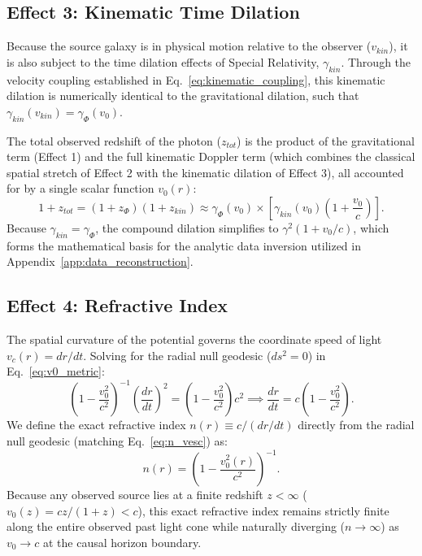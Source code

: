 \documentclass[11pt]{article}
\begin{document}
\subsection{Effect 3: Kinematic Time Dilation}
Because the source galaxy is in physical motion relative to the observer ($v_{kin}$), it is also subject to the time dilation effects of Special Relativity, $\gamma_{kin}$. Through the velocity coupling established in Eq.~\ref{eq:kinematic_coupling}, this kinematic dilation is numerically identical to the gravitational dilation, such that $\gamma_{kin}(v_{kin}) = \gamma_{\Phi}(v_0)$.

The total observed redshift of the photon ($z_{tot}$) is the product of the gravitational term (Effect 1) and the full kinematic Doppler term (which combines the classical spatial stretch of Effect 2 with the kinematic dilation of Effect 3), all accounted for by a single scalar function $v_0(r)$:
\begin{equation}
1 + z_{tot} = (1 + z_{\Phi}) (1 + z_{kin}) \approx \gamma_{\Phi}(v_0) \times \left[ \gamma_{kin}(v_0) \left(1 + \frac{v_0}{c}\right) \right].
\end{equation}
Because $\gamma_{kin} = \gamma_{\Phi}$, the compound dilation simplifies to $\gamma^2(1+v_0/c)$, which forms the mathematical basis for the analytic data inversion utilized in Appendix~\ref{app:data_reconstruction}.

\subsection{Effect 4: Refractive Index}
The spatial curvature of the potential governs the coordinate speed of light $v_c(r) = dr/dt$. Solving for the radial null geodesic ($ds^2=0$) in Eq.~\ref{eq:v0_metric}:
\begin{equation}
\left(1 - \frac{v_0^2}{c^2}\right)^{-1} \left(\frac{dr}{dt}\right)^2 = \left(1 - \frac{v_0^2}{c^2}\right) c^2 \implies \frac{dr}{dt} = c\left(1 - \frac{v_0^2}{c^2}\right).
\end{equation}
We define the exact refractive index $n(r) \equiv c / (dr/dt)$ directly from the radial null geodesic (matching Eq.~\ref{eq:n_vesc}) as:
\begin{equation}
n(r) = \left(1 - \frac{v_0^2(r)}{c^2}\right)^{-1}.
\end{equation}
Because any observed source lies at a finite redshift $z < \infty$ ($v_0(z) = c z/(1+z) < c$), this exact refractive index remains strictly finite along the entire observed past light cone while naturally diverging ($n \to \infty$) as $v_0 \to c$ at the causal horizon boundary.
\end{document}
